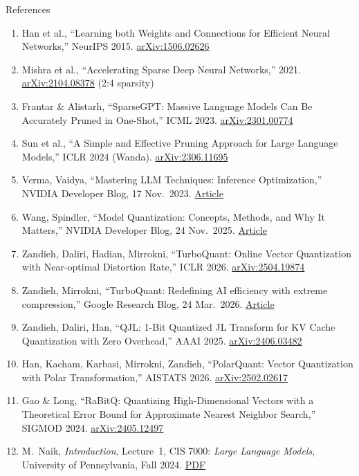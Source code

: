 \begin{frame}[allowframebreaks]{References}
\begin{enumerate}
    \item Han et al., ``Learning both Weights and Connections for Efficient Neural Networks,'' NeurIPS 2015. \href{https://arxiv.org/abs/1506.02626}{arXiv:1506.02626}
    \item Mishra et al., ``Accelerating Sparse Deep Neural Networks,'' 2021. \href{https://arxiv.org/abs/2104.08378}{arXiv:2104.08378} (2:4 sparsity)
    \item Frantar \& Alistarh, ``SparseGPT: Massive Language Models Can Be Accurately Pruned in One-Shot,'' ICML 2023. \href{https://arxiv.org/abs/2301.00774}{arXiv:2301.00774}
    \item Sun et al., ``A Simple and Effective Pruning Approach for Large Language Models,'' ICLR 2024 (Wanda). \href{https://arxiv.org/abs/2306.11695}{arXiv:2306.11695}
    \item Verma, Vaidya, ``Mastering LLM Techniques: Inference Optimization,'' NVIDIA Developer Blog, 17 Nov.\ 2023. \href{https://developer.nvidia.com/blog/mastering-llm-techniques-inference-optimization/}{Article}
    \item Wang, Spindler, ``Model Quantization: Concepts, Methods, and Why It Matters,'' NVIDIA Developer Blog, 24 Nov.\ 2025. \href{https://developer.nvidia.com/blog/model-quantization-concepts-methods-and-why-it-matters/}{Article}
    \item Zandieh, Daliri, Hadian, Mirrokni, ``TurboQuant: Online Vector Quantization with Near-optimal Distortion Rate,'' ICLR 2026. \href{https://arxiv.org/abs/2504.19874}{arXiv:2504.19874}
    \item Zandieh, Mirrokni, ``TurboQuant: Redefining AI efficiency with extreme compression,'' Google Research Blog, 24 Mar.\ 2026. \href{https://research.google/blog/turboquant-redefining-ai-efficiency-with-extreme-compression/}{Article}
    \item Zandieh, Daliri, Han, ``QJL: 1-Bit Quantized JL Transform for KV Cache Quantization with Zero Overhead,'' AAAI 2025. \href{https://arxiv.org/abs/2406.03482}{arXiv:2406.03482}
    \item Han, Kacham, Karbasi, Mirrokni, Zandieh, ``PolarQuant: Vector Quantization with Polar Transformation,'' AISTATS 2026. \href{https://arxiv.org/abs/2502.02617}{arXiv:2502.02617}
    \item Gao \& Long, ``RaBitQ: Quantizing High-Dimensional Vectors with a Theoretical Error Bound for Approximate Nearest Neighbor Search,'' SIGMOD 2024. \href{https://arxiv.org/abs/2405.12497}{arXiv:2405.12497}
    \item M.~Naik, \textit{Introduction}, Lecture~1, CIS 7000: \textit{Large Language Models}, University of Pennsylvania, Fall 2024. \href{https://llm-class.github.io/slides/Lecture\%201\%20-\%20Introduction\%20and\%20Course\%20Overview.pdf}{PDF}

\end{enumerate}
\end{frame}
